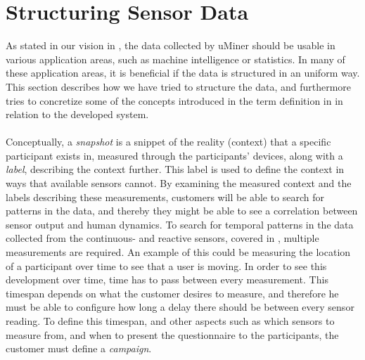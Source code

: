 
\section{Structuring Sensor Data}
\label{sec:modeling_sensor_data}

As stated in our vision in , the data collected by uMiner should be usable in various application areas, such as machine intelligence or statistics. In many of these application areas, it is beneficial if the data is structured in an uniform way. This section describes how we have tried to structure the data, and furthermore tries to concretize some of the concepts introduced in the term definition in  in relation to the developed system. 
\\\\
Conceptually, a \emph{snapshot} is a snippet of the reality (context) that a specific participant exists in, measured through the participants' devices, along with a \emph{label}, describing the context further. This label is used to define the context in ways that available sensors cannot. By examining the measured context and the labels describing these measurements, customers will be able to search for patterns in the data, and thereby they might be able to see a correlation between sensor output and human dynamics. To search for temporal patterns in the data collected from the continuous- and reactive sensors, covered in , multiple measurements are required. An example of this could be measuring the location of a participant over time to see that a user is moving. In order to see this development over time, time has to pass between every measurement. This timespan depends on what the customer desires to measure, and therefore he must be able to configure how long a delay there should be between every sensor reading. To define this timespan, and other aspects such as which sensors to measure from, and when to present the questionnaire to the participants, the customer must define a \emph{campaign}.
\\\\
